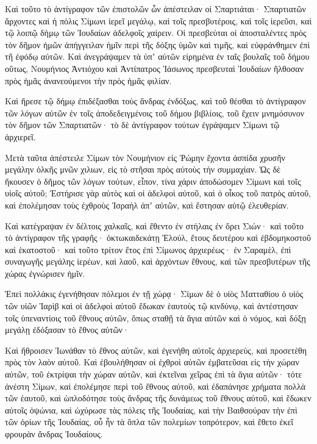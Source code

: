 {\par }{\PP {}Καὶ τοῦτο τὸ ἀντίγραφον τῶν ἐπιστολῶν ὧν ἀπέστειλαν οἱ Σπαρτιάται· Σπαρτιατῶν ἄρχοντες καὶ ἡ πόλις Σίμωνι ἱερεῖ μεγάλῳ, καὶ τοῖς πρεσβυτέροις, καὶ τοῖς ἱερεῦσι, καὶ τῷ λοιπῷ δήμῳ τῶν Ἰουδαίων ἀδελφοῖς χαίρειν.
Οἱ πρεσβεύται οἱ ἀποσταλέντες πρὸς τὸν δῆμον ἡμῶν ἀπήγγειλαν ἡμῖν περὶ τῆς δόξης ὑμῶν καὶ τιμῆς, καὶ εὐφράνθημεν ἐπὶ τῆ ἐφόδῳ αὐτῶν.
Καὶ ἀνεγράψαμεν τὰ ὑπʼ αὐτῶν εἰρημένα ἐν ταῖς βουλαῖς τοῦ δήμου οὕτως, Νουμήνιος Ἀντιόχου καὶ Ἀντίπατρος Ἰάσωνος πρεσβευταὶ Ἰουδαίων ἤλθοσαν πρὸς ἡμᾶς ἀνανεούμενοι τὴν πρὸς ἡμᾶς φιλίαν.
\par }{\PP {}Καὶ ἤρεσε τῷ δήμῳ ἐπιδέξασθαι τοὺς ἄνδρας ἐνδόξως, καὶ τοῦ θέσθαι τὸ ἀντίγραφον τῶν λόγων αὐτῶν ἐν τοῖς ἀποδεδειγμένοις τοῦ δήμου βιβλίοις, τοῦ ἔχειν μνημόσυνον τὸν δῆμον τῶν Σπαρτιατῶν· τὸ δὲ ἀντίγραφον τούτων ἐγράψαμεν Σίμωνι τῷ ἀρχιερεῖ.
\par }{\PP {}Μετὰ ταῦτα ἀπέστειλε Σίμων τὸν Νουμήνιον εἰς Ῥώμην ἔχοντα ἀσπίδα χρυσῆν μεγάλην ὁλκῆς μνῶν χιλιων, εἰς τὸ στῆσαι πρὸς αὐτοὺς τὴν συμμαχίαν.
Ὡς δὲ ἤκουσεν ὁ δῆμος τῶν λόγων τούτων, εἶπον, τίνα χάριν ἀποδώσομεν Σίμωνι καὶ τοῖς υἱοῖς αὐτοῦ;
Ἐστήρισε γὰρ αὐτὸς καὶ οἱ ἀδελφοὶ αὐτοῦ, καὶ ὁ οἶκος τοῦ πατρὸς αὐτοῦ, καὶ ἐπολέμησαν τοὺς ἐχθροὺς Ἰσραὴλ ἀπʼ αὐτῶν, καὶ ἔστησαν αὐτῷ ἐλευθερίαν.
\par }{\PP {}Καὶ κατέγραψαν ἐν δέλτοις χαλκαῖς, καὶ ἔθεντο ἐν στήλαις ἐν ὄρει Σιών· καὶ τοῦτο τὸ ἀντίγραφον τῆς γραφῆς· ὀκτωκαιδεκάτῃ Ἐλούλ, ἔτους δευτέρου καὶ ἑβδομηκοστοῦ καὶ ἑκατοστοῦ· καὶ τοῦτο τρίτον ἔτος ἐπὶ Σίμωνος ἀρχιερέως·
ἐν Σαραμὲλ, ἐπὶ συναγωγῆς μεγάλης ἱερέων, καὶ λαοῦ, καὶ ἀρχόντων ἔθνους, καὶ τῶν πρεσβυτέρων τῆς χώρας ἐγνώρισεν ἡμῖν.
\par }{\PP {}Ἐπεὶ πολλάκις ἐγενήθησαν πόλεμοι ἐν τῇ χώρᾳ· Σίμων δὲ ὁ υἱὸς Ματταθίου ὁ υἱὸς τῶν υἱῶν Ἰαρὶβ καὶ οἱ ἀδελφοὶ αὐτοῦ ἔδωκαν ἑαυτοὺς τῷ κινδύνῳ, καὶ ἀντέστησαν τοῖς ὑπεναντίοις τοῦ ἔθνους αὐτῶν, ὅπως σταθῇ τὰ ἅγια αὐτῶν καὶ ὁ νόμος, καὶ δόξῃ μεγάλῃ ἐδόξασαν τὸ ἔθνος αὐτῶν·
\par }{\PP {}Καὶ ἤθροισεν Ἰωνάθαν τὸ ἔθνος αὐτῶν, καὶ ἐγενήθη αὐτοῖς ἀρχιερεὺς, καὶ προσετέθη πρὸς τὸν λαὸν αὐτοῦ.
Καὶ ἐβουλήθησαν οἱ ἐχθροὶ αὐτῶν ἐμβατεῦσαι εἰς τὴν χώραν αὐτῶν, τοῦ ἐκτρίψαι τὴν χώραν αὐτῶν, καὶ ἐκτεῖναι χεῖρας ἐπὶ τὰ ἅγια αὐτῶν·
τότε ἀνέστη Σίμων, καὶ ἐπολέμησε περὶ τοῦ ἔθνους αὐτοῦ, καὶ ἐδαπάνησε χρήματα πολλὰ τῶν ἑαυτοῦ, καὶ ὡπλοδότησε τοὺς ἄνδρας τῆς δυνάμεως τοῦ ἔθνους αὐτοῦ, καὶ ἔδωκεν αὐτοῖς ὀψώνια,
καὶ ὠχύρωσε τὰς πόλεις τῆς Ἰουδαίας, καὶ τὴν Βαιθσούραν τὴν ἐπὶ τῶν ὁρίων τῆς Ἰουδαίας, οὗ ἦν τὰ ὅπλα τῶν πολεμίων τοπρότερον, καὶ ἔθετο ἐκεῖ φρουρὰν ἄνδρας Ἰουδαίους.
}
